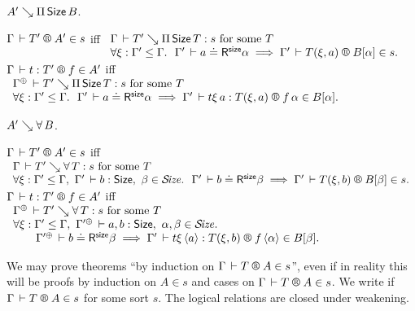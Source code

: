 \documentclass[acmlarge,review,anonymous]{acmart}\settopmatter{printfolios=true}
\newcommand{\LONGVERSION}[1]{}
\newcommand{\SHORTVERSION}[1]{#1}
\begin{document}
\begin{caselist}
\vspace{2ex}
\nextcase $A' \searrow \Pi\,\mathsf{Size}\, B$.

\noindent
$\LRTS \Gamma {T'} {A'} s$ iff
\(
\begin{array}[t]{l}
\Gamma \der T' \evalsto \piT \Size T : s \mforsome T\\
\forall \xi : \Gamma' \leq \Gamma.\ \
\LRSize {\Gamma'} a \alpha
\implies \LRTS {\Gamma'} {T(\xi,a)} {B[\alpha]} s
.
\end{array}
\) \\
$\LR \Gamma t {T'} f {A'}$ iff
\(
\begin{array}[t]{l}
\resurrect\Gamma \der T' \evalsto \piT \Size T : s \mforsome T\\
\forall \xi : \Gamma' \leq \Gamma.\ \
\LRSize {\Gamma'} a \alpha
\implies \LR {\Gamma'} {t\xi\,a} {T(\xi,a)} {f\,\alpha} {B[\alpha]}
.
\end{array}
\)

\vspace{2ex}
\nextcase $A' \searrow \forall\, B$.

\noindent
$\LRTS \Gamma {T'} {A'} s$ iff
\(
\begin{array}[t]{l}
\Gamma \der T' \evalsto \forallT T : s \mforsome T\\
\forall \xi : \Gamma' \leq \Gamma,\
{\Gamma'} \der b : \Size,\
\beta \in \SIZE. \ \
\LRSize {\Gamma'} b \beta
\implies \LRTS {\Gamma'} {T(\xi,b)} {B[\beta]} s
.
\end{array}
\) \\
$\LR \Gamma t {T'} f {A'}$ iff
\(
\begin{array}[t]{l}
\resurrect\Gamma \der T' \evalsto \forallT T : s \mforsome T\\
\forall \xi : \Gamma' \leq \Gamma,\
\resurrect{\Gamma'} \der a,b : \Size,\
\alpha,\beta \in \SIZE. \ \\ \qquad
\LRSize {\resurrect{\Gamma'}} b \beta
\implies \LR {\Gamma'} {t\xi\,\ann a} {T(\xi,b)} {f\,\ann\alpha} {B[\beta]}
.
\end{array}
\)
\end{caselist}
We may prove theorems ``by induction on $\LRTS \Gamma T A s$'', even if in reality this will be proofs by induction on $A \in s$ and cases on $\LRTS \Gamma T A s$.
We write \fbox{$\RG \Gamma T A$} if\/ $\LRTS \Gamma T A s$ for some sort $s$.
\SHORTVERSION{The logical relations are closed under weakening.}
\LONGVERSION{ %
\begin{lemma}[Weakening]
  Let $\xi : \Gamma' \leq \Gamma$.
  \begin{enumerate}
  \item If\/ $\LRSize \Gamma a \alpha$ then $\LRSize{\Gamma'}{a\xi}\alpha$.
  \item If\/ $\LRTS {\Gamma} T A s$ then $\LRTS{\Gamma'}{T\xi}A s$.
  \item If\/ $\LR \Gamma t T f A$ then $\LR{\Gamma'}{t\xi}{T\xi} f A$.
  \end{enumerate}
\end{lemma}
} %
\end{document}
